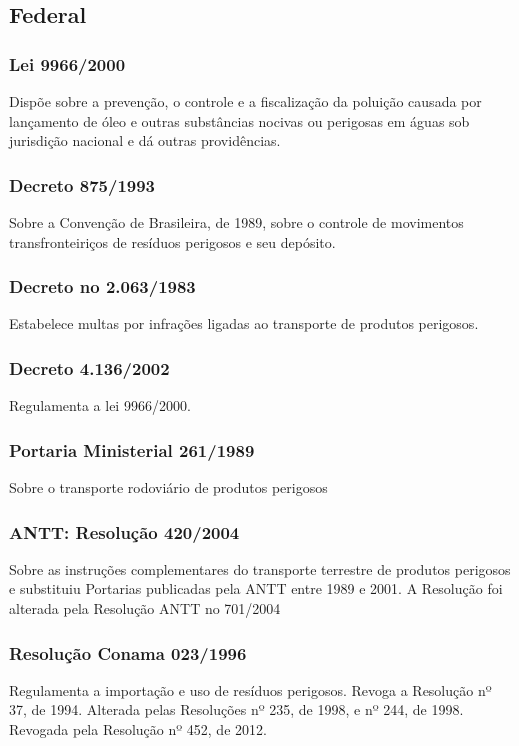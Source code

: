 \begin{subapend}
	\subsection{Federal}
	\begin{subsubapend}
		\item \subsubsection{Lei 9966/2000}
		Dispõe sobre a prevenção, o controle e a fiscalização da poluição causada por lançamento de óleo e outras substâncias nocivas ou perigosas em águas sob jurisdição nacional e dá outras providências.
		\subsubsection{Decreto 875/1993}
		Sobre a Convenção de Brasileira, de 1989, sobre o controle de movimentos transfronteiriços de resíduos perigosos e seu depósito.
		\subsubsection{Decreto no 2.063/1983}
		Estabelece multas por infrações ligadas ao transporte de produtos perigosos.
		\subsubsection{Decreto 4.136/2002}
		Regulamenta a lei 9966/2000.
		\subsubsection{Portaria Ministerial 261/1989}
		Sobre o transporte rodoviário de produtos perigosos
		\subsubsection{ANTT: Resolução 420/2004}
		Sobre as instruções complementares do transporte terrestre de produtos perigosos e substituiu Portarias publicadas pela ANTT entre 1989 e 2001. A Resolução foi alterada pela Resolução ANTT no 701/2004
		\subsubsection{Resolução Conama 023/1996}
		Regulamenta a importação e uso de resíduos perigosos. Revoga a Resolução nº 37, de 1994. Alterada pelas Resoluções nº 235, de 1998, e nº 244, de 1998. Revogada pela Resolução nº 452, de 2012.

\end{subsubapend}
\end{subapend}
